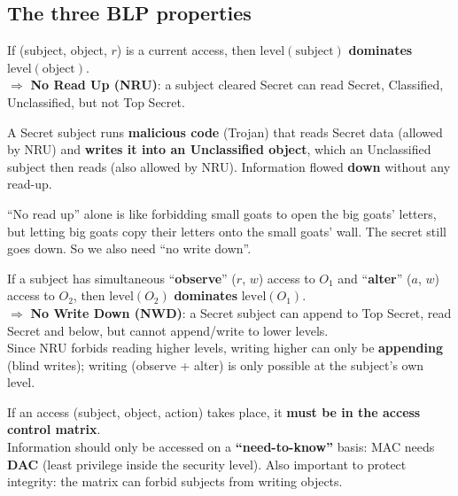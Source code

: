 \subsection{The three BLP properties}

\begin{defnbox}[title=Simple security property (ss-property) --- No Read Up]
If (subject, object, $r$) is a current access, then $\text{level}(\text{subject})$
\textbf{dominates} $\text{level}(\text{object})$. \\
$\Rightarrow$ \textbf{No Read Up (NRU)}: a subject cleared Secret can read Secret,
Classified, Unclassified, but not Top Secret.
\end{defnbox}

\begin{warnbox}[title=Why is the ss-property not sufficient?]
A Secret subject runs \textbf{malicious code} (Trojan) that reads Secret data (allowed
by NRU) and \textbf{writes it into an Unclassified object}, which an Unclassified subject
then reads (also allowed by NRU). Information flowed \textbf{down} without any read-up.
\end{warnbox}

\begin{goatbox}
``No read up'' alone is like forbidding small goats to open the big goats' letters, but letting
big goats copy their letters onto the small goats' wall. The secret still goes down. So we also
need ``no write down''.
\end{goatbox}

\begin{defnbox}[title=Star property (*-property) --- No Write Down]
If a subject has simultaneous ``\textbf{observe}'' ($r$, $w$) access to $O_1$ and
``\textbf{alter}'' ($a$, $w$) access to $O_2$, then $\text{level}(O_2)$
\textbf{dominates} $\text{level}(O_1)$. \\
$\Rightarrow$ \textbf{No Write Down (NWD)}: a Secret subject can append to Top Secret,
read Secret and below, but cannot append/write to lower levels. \\
Since NRU forbids reading higher levels, writing higher can only be \textbf{appending} (blind
writes); writing (observe + alter) is only possible at the subject's own level.
\end{defnbox}

\begin{defnbox}[title=Discretionary property (ds-property)]
If an access (subject, object, action) takes place, it \textbf{must be in the access
control matrix}. \\
Information should only be accessed on a \textbf{``need-to-know''} basis: MAC needs
\textbf{DAC} (least privilege inside the security level). Also important to protect
integrity: the matrix can forbid subjects from writing objects.
\end{defnbox}


